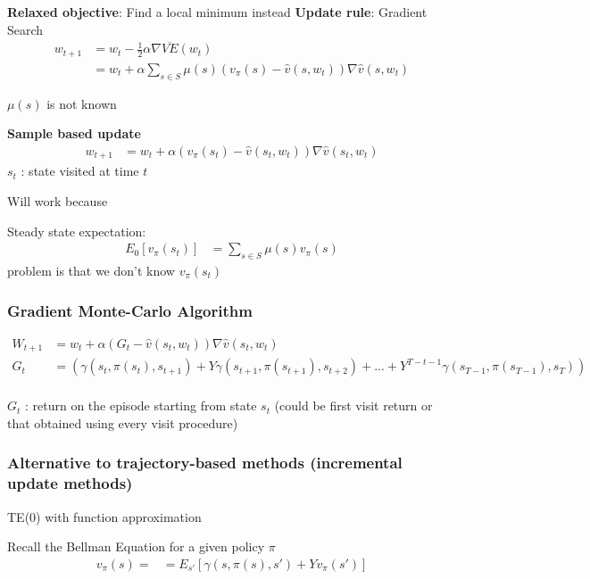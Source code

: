 \documentclass[11pt]{article}
\begin{document}
\textbf{Relaxed objective}: Find a local minimum instead
\textbf{Update rule}: Gradient Search
\begin{align}
w_{t+1} &= w_t - \frac{1}{2}\alpha \nabla \overline{VE}(w_t) \\
        &= w_t + \alpha \sum_{s \in S}\mu(s) \left( v_{\pi}(s) - \hat{v}(s, w_t) \right) \nabla \hat{v} (s, w_t)
\end{align}

\(\mu(s)\) is not known

\textbf{Sample based update}
\begin{align*}
w_{t+1} &= w_t + \alpha (v_{\pi}(s_t) - \hat{v}(s_t, w_t)) \nabla \hat{v}(s_t, w_t)
\end{align*}
\(s_t\) : state visited at time \(t\)

Will work because

Steady state expectation:
\begin{align*}
E_0[v_{\pi}(s_t)] &= \sum_{s \in S} \mu(s) v_{\pi}(s)
\end{align*}
problem is that we don't know \(v_{\pi}(s_t)\)

\subsubsection{Gradient Monte-Carlo Algorithm}
\label{sec:orgb23dd70}

\begin{align*}
W_{t+1} &= w_t + \alpha \left( G_t - \hat{v}(s_t, w_t) \right) \nabla\hat{v}(s_t, w_t) \\
    G_t &= (\gamma(s_t, \pi(s_t), s_{t+1}) + Y\gamma(s_{t+1}, \pi(s_{t+1}), s_{t+2}) + ... + Y^{T-t-1} \gamma(s_{T-1}, \pi(s_{T-1}), s_T)) \\
\end{align*}

\(G_t\) : return on the episode starting from state \(s_t\) (could be first visit return or that obtained using every visit procedure)

\subsubsection{Alternative to trajectory-based methods (incremental update methods)}
\label{sec:orgbf30100}
TE(0) with function approximation

Recall the Bellman Equation for a given policy \(\pi\)
\begin{align*}
v_{\pi}(s) =&= E_{s'}\left[ \gamma(s, \pi(s), s') + Yv_{\pi}(s') \right]
\end{align*}
\end{document}

